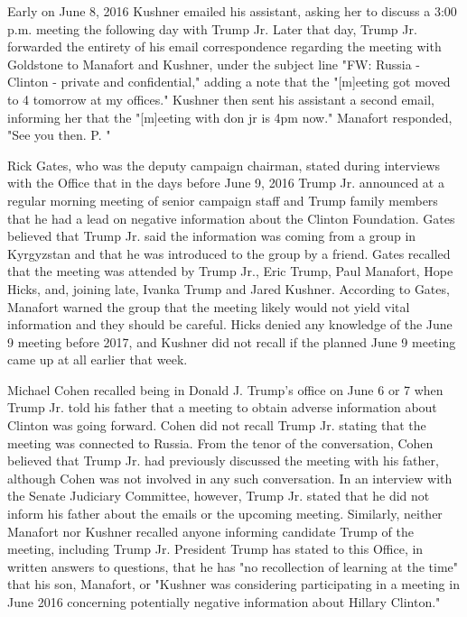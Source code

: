 Early on June 8, 2016 Kushner emailed his assistant, asking her to discuss a 3:00 p.m. meeting the following day with Trump Jr.%
Later that day, Trump Jr. forwarded the entirety of his email correspondence regarding the meeting with Goldstone to Manafort and Kushner, under the subject line "FW: Russia - Clinton - private and confidential," adding a note that the "[m]eeting got moved to 4 tomorrow at my offices."%
Kushner then sent his assistant a second email, informing her that the "[m]eeting with don jr is 4pm now."%
Manafort responded, "See you then. P. "%

Rick Gates, who was the deputy campaign chairman, stated during interviews with the Office that in the days before June 9, 2016 Trump Jr. announced at a regular morning meeting of senior campaign staff and Trump family members that he had a lead on negative information about the Clinton Foundation.%
Gates believed that Trump Jr. said the information was coming from a group in Kyrgyzstan and that he was introduced to the group by a friend.%
Gates recalled that the meeting was attended by Trump Jr., Eric Trump, Paul Manafort, Hope Hicks, and, joining late, Ivanka Trump and Jared Kushner.
According to Gates, Manafort warned the group that the meeting likely would not yield vital information and they should be careful.%
Hicks denied any knowledge of the June 9 meeting before 2017,%
and Kushner did not recall if the planned June 9 meeting came up at all earlier that week.%

Michael Cohen recalled being in Donald J. Trump's office on June 6 or 7 when Trump Jr. told his father that a meeting to obtain adverse information about Clinton was going forward.%
Cohen did not recall Trump Jr. stating that the meeting was connected to Russia.%
From the tenor of the conversation, Cohen believed that Trump Jr. had previously discussed the meeting with his father, although Cohen was not involved in any such conversation.%
In an interview with the Senate Judiciary Committee, however, Trump Jr. stated that he did not inform his father about the emails or the upcoming meeting.%
Similarly, neither Manafort nor Kushner recalled anyone informing candidate Trump of the meeting, including Trump Jr.%
President Trump has stated to this Office, in written answers to questions, that he has "no recollection of learning at the time" that his son, Manafort, or "Kushner was considering participating in a meeting in June 2016 concerning potentially negative information about Hillary Clinton."%

